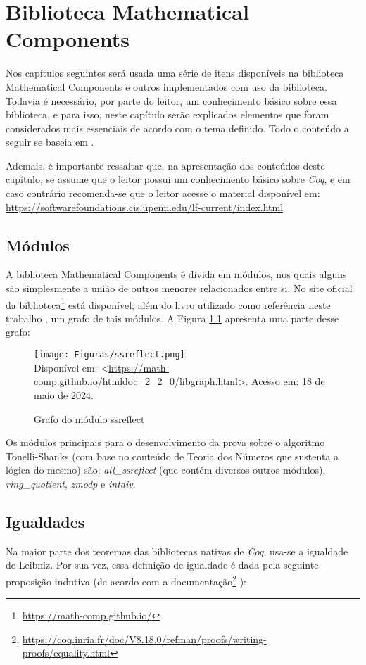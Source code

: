 \chapter{Biblioteca Mathematical Components}
\label{cap:mathcomp}

Nos capítulos seguintes será usada uma série de itens disponíveis na biblioteca Mathematical Components e outros implementados com uso da biblioteca. Todavia é necessário, por parte do leitor, um conhecimento básico sobre essa biblioteca, e para isso, neste capítulo serão explicados elementos que foram considerados mais essenciais de acordo com o tema definido. Todo o conteúdo a seguir se baseia em \cite{assia_mahboubi_2022_7118596}.

Ademais, é importante ressaltar que, na apresentação dos conteúdos deste capítulo, se assume que o leitor possui um conhecimento básico sobre \textit{Coq}, e em caso contrário recomenda-se que o leitor acesse o material disponível em: \url{https://softwarefoundations.cis.upenn.edu/lf-current/index.html}

\section{Módulos}
A biblioteca Mathematical Components é divida em módulos, nos quais alguns são simplesmente a união de outros menores relacionados entre si. No site oficial da biblioteca\footnote{\url{https://math-comp.github.io/}} está disponível, além do livro utilizado como referência neste trabalho \cite{assia_mahboubi_2022_7118596}, um grafo
de tais módulos. A Figura \ref{fig:graph-mathcomp} apresenta uma parte desse grafo:

\begin{figure}[h]
        \centering
        \caption{Grafo do módulo ssreflect}
        \texttt{[image: Figuras/ssreflect.png]}\\
        \footnotesize{Disponível em: <\url{https://math-comp.github.io/htmldoc_2_2_0/libgraph.html}>.
        Acesso em: 18 de maio de 2024.}
        \label{fig:graph-mathcomp}
\end{figure}

Os módulos principais para o desenvolvimento da prova sobre o algoritmo Tonelli-Shanks (com base no conteúdo de Teoria dos Números que sustenta a lógica do mesmo) são: \textit{all\_ssreflect} (que contém diversos outros módulos), \textit{ring\_quotient}, \textit{zmodp} e \textit{intdiv}.

\section{Igualdades}
Na maior parte dos teoremas das bibliotecas nativas de \textit{Coq}, usa-se a igualdade de Leibniz. Por sua vez, essa definição de igualdade é dada pela seguinte proposição indutiva (de acordo com a documentação\footnote{\url{https://coq.inria.fr/doc/V8.18.0/refman/proofs/writing-proofs/equality.html}} \cite{coqteam2022manual}):

